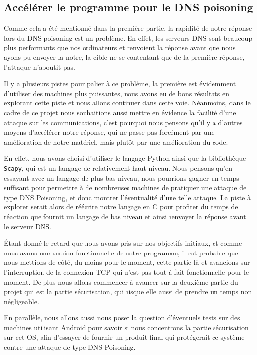 \documentclass[a4paper, 12pt,twoside]{article}
\begin{document}
    \subsection{Accélérer le programme pour le DNS poisoning}
    
    Comme cela a été mentionné dans la première partie, la rapidité de notre réponse lors du DNS poisoning est un problème.
    En effet, les serveurs DNS sont beaucoup plus performants que nos ordinateurs et renvoient la réponse avant que nous ayons pu envoyer la notre, la cible ne se contentant que de la première réponse, l'attaque n'aboutit pas.

    Il y a plusieurs pistes pour palier à ce problème, la première est évidemment d'utiliser des machines plus puissantes, nous avons eu de bons résultats en explorant cette piste et nous allons continuer dans cette voie. Néanmoins, dans le cadre de ce projet nous souhaitions aussi mettre en évidence la facilité d'une attaque sur les communications, c'est pourquoi nous pensons qu'il y a d'autres moyens d'accélérer notre réponse, qui ne passe pas forcément par une amélioration de notre matériel, mais plutôt par une amélioration du code.

    En effet, nous avons choisi d'utiliser le langage Python ainsi que la bibliothèque \texttt{Scapy}, qui est un langage de relativement haut-niveau. Nous pensons qu'en essayant avec un langage de plus bas niveau, nous pourrions gagner un temps suffisant pour permettre à de nombreuses machines de pratiquer une attaque de type DNS Poisoning, et donc montrer l'éventualité d'une telle attaque. La piste à explorer serait alors de réécrire notre langage en C pour profiter du temps de réaction que fournit un langage de bas niveau et ainsi renvoyer la réponse avant le serveur DNS.

    Étant donné le retard que nous avons pris sur nos objectifs initiaux, et comme nous avons une version fonctionnelle de notre programme, il est probable que nous mettions de côté, du moins pour le moment, cette partie-là et avancions sur l'interruption de la connexion TCP qui n'est pas tout à fait fonctionnelle pour le moment.
    De plus nous allons commencer à avancer sur la deuxième partie du projet qui est la partie sécurisation, qui risque elle aussi de prendre un temps non négligeable.

    En parallèle, nous allons aussi nous poser la question d'éventuels tests sur des machines utilisant Android pour savoir si nous concentrons la partie sécurisation sur cet OS, afin d'essayer de fournir un produit final qui protégerait ce système contre une attaque de type DNS Poisoning.
\end{document}
